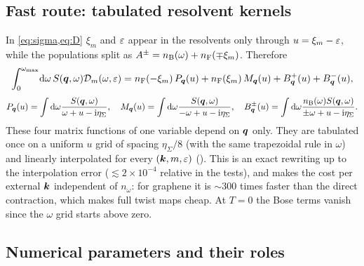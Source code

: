 \subsection{Fast route: tabulated resolvent kernels}
\label{sec:kernel}

In \cref{eq:sigma,eq:D} $\xi_m$ and $\varepsilon$ appear in the resolvents only through $u=\xi_m-\varepsilon$, while the
populations split as $A^\pm=n_{\rm B}(\omega)+n_{\rm F}(\mp\xi_m)$. Therefore
\begin{equation}
\int_0^{\omega_{\max}}\!\mathrm d\omega\,S(\bm q,\omega)\mathcal D_m(\omega,\varepsilon)=n_{\rm F}(-\xi_m)\,P_{\bm q}(u)+n_{\rm F}(\xi_m)\,M_{\bm q}(u)+B^+_{\bm q}(u)+B^-_{\bm q}(u),
\label{eq:kernel}
\end{equation}
\begin{equation}
P_{\bm q}(u)=\int\mathrm d\omega\frac{S(\bm q,\omega)}{\omega+u-\mathrm i\eta_\Sigma},\quad
M_{\bm q}(u)=\int\mathrm d\omega\frac{S(\bm q,\omega)}{-\omega+u-\mathrm i\eta_\Sigma},\quad
B^\pm_{\bm q}(u)=\int\mathrm d\omega\frac{n_{\rm B}(\omega)S(\bm q,\omega)}{\pm\omega+u-\mathrm i\eta_\Sigma}.
\end{equation}
These four matrix functions of one variable depend on $\bm q$ only. They are tabulated once on a uniform $u$ grid
of spacing $\eta_\Sigma/8$ (with the same trapezoidal rule in $\omega$) and linearly interpolated for every
$(\bm k,m,\varepsilon)$ (). This is an exact rewriting up to the interpolation error
($\lesssim2\times10^{-4}$ relative in the tests), and makes the cost per external $\bm k$ independent of $n_\omega$:
for graphene it is $\sim300$ times faster than the direct contraction, which makes full twist maps cheap.
At $T=0$ the Bose terms vanish since the $\omega$ grid starts above zero.

\subsection{Numerical parameters and their roles}

